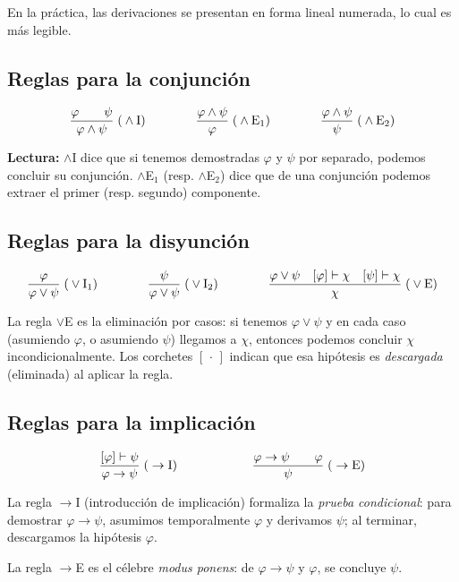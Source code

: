 En la práctica, las derivaciones se presentan en forma lineal numerada, lo cual es más legible.

\subsection{Reglas para la conjunción}

\[
  \infr[\wedge\mathrm{I}]{\varphi \qquad \psi}{\varphi \wedge \psi}
  \qquad\qquad
  \infr[\wedge\mathrm{E}_1]{\varphi \wedge \psi}{\varphi}
  \qquad\qquad
  \infr[\wedge\mathrm{E}_2]{\varphi \wedge \psi}{\psi}
\]

\textbf{Lectura:} $\wedge$I dice que si tenemos demostradas $\varphi$ y $\psi$ por separado, podemos concluir su conjunción. $\wedge$E$_1$ (resp. $\wedge$E$_2$) dice que de una conjunción podemos extraer el primer (resp. segundo) componente.

\subsection{Reglas para la disyunción}

\[
  \infr[\vee\mathrm{I}_1]{\varphi}{\varphi \vee \psi}
  \qquad\qquad
  \infr[\vee\mathrm{I}_2]{\psi}{\varphi \vee \psi}
  \qquad\qquad
  \infr[\vee\mathrm{E}]{\varphi \vee \psi \quad [\varphi] \vdash \chi \quad [\psi] \vdash \chi}{\chi}
\]

La regla $\vee$E es la eliminación por casos: si tenemos $\varphi \vee \psi$ y en cada caso (asumiendo $\varphi$, o asumiendo $\psi$) llegamos a $\chi$, entonces podemos concluir $\chi$ incondicionalmente. Los corchetes $[\,\cdot\,]$ indican que esa hipótesis es \emph{descargada} (eliminada) al aplicar la regla.

\subsection{Reglas para la implicación}

\[
  \infr[\to\mathrm{I}]{[\varphi] \vdash \psi}{\varphi \to \psi}
  \qquad\qquad\qquad
  \infr[\to\mathrm{E}]{\varphi \to \psi \qquad \varphi}{\psi}
\]

La regla $\to$I (introducción de implicación) formaliza la \emph{prueba condicional}: para demostrar $\varphi \to \psi$, asumimos temporalmente $\varphi$ y derivamos $\psi$; al terminar, descargamos la hipótesis $\varphi$.

La regla $\to$E es el célebre \emph{modus ponens}: de $\varphi \to \psi$ y $\varphi$, se concluye $\psi$.

